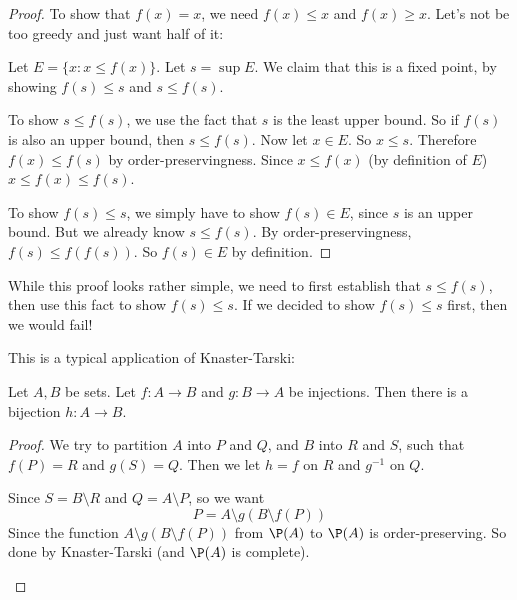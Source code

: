 \documentclass[a4paper]{article}
\begin{document}
\begin{proof}
  To show that $f(x) = x$, we need $f(x) \leq x$ and $f(x) \geq x$. Let's not be too greedy and just want half of it:

  Let $E = \{x: x \leq f(x)\}$. Let $s = \sup E$. We claim that this is a fixed point, by showing $f(s) \leq s$ and $s \leq f(s)$.

  To show $s \leq f(s)$, we use the fact that $s$ is the least upper bound. So if $f(s)$ is also an upper bound, then $s \leq f(s)$. Now let $x \in E$. So $x\leq s$. Therefore $f(x) \leq f(s)$ by order-preservingness. Since $x \leq f(x)$ (by definition of $E$) $x \leq f(x) \leq f(s)$.

  To show $f(s) \leq s$, we simply have to show $f(s) \in E$, since $s$ is an upper bound. But we already know $s \leq f(s)$. By order-preservingness, $f(s) \leq f(f(s))$. So $f(s)\in E$ by definition.
\end{proof}
While this proof looks rather simple, we need to first establish that $s \leq f(s)$, then use this fact to show $f(s) \leq s$. If we decided to show $f(s) \leq s$ first, then we would fail!

This is a typical application of Knaster-Tarski:
\begin{cor}
  Let $A, B$ be sets. Let $f: A\to B$ and $g: B\to A$ be injections. Then there is a bijection $h: A\to B$. 
\end{cor}

\begin{proof}
  We try to partition $A$ into $P$ and $Q$, and $B$ into $R$ and $S$, such that $f(P) = R$ and $g(S) = Q$. Then we let $h = f$ on $R$ and $g^{-1}$ on $Q$.

  Since $S = B\setminus R$ and $Q = A \setminus P$, so we want
  \[
    P = A\setminus g(B\setminus f(P))
  \]
  Since the function $A\setminus g(B\setminus f(P))$ from $\P(A)$ to $\P(A)$ is order-preserving. So done by Knaster-Tarski (and $\P(A)$ is complete).

  \begin{center}
  \end{center}
\end{proof}
\end{document}

